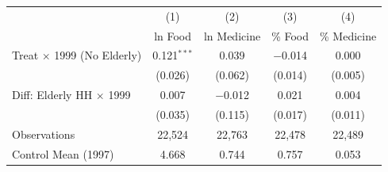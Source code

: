 \begin{tabular}{lcccc}
\toprule
 & (1) & (2) & (3) & (4) \\
 & ln Food & ln Medicine & \% Food & \% Medicine \\
\midrule
Treat $\times$ 1999 (No Elderly)   & 0.121$^{***}$ & 0.039 & $-$0.014 & 0.000 \\
                                    & (0.026) & (0.062) & (0.014) & (0.005) \\[4pt]
Diff: Elderly HH $\times$ 1999     & 0.007 & $-$0.012 & 0.021 & 0.004 \\
                                    & (0.035) & (0.115) & (0.017) & (0.011) \\[4pt]
Observations                        & 22,524 & 22,763 & 22,478 & 22,489 \\
Control Mean (1997)                 & 4.668 & 0.744 & 0.757 & 0.053 \\
\bottomrule
\end{tabular}


